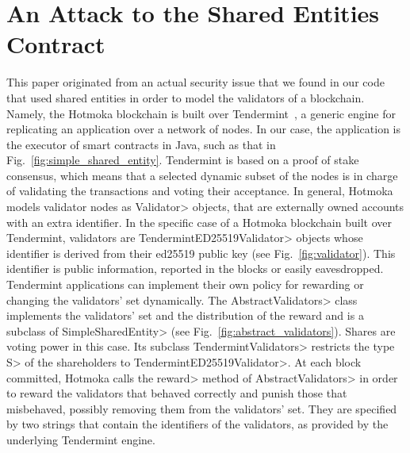 \section{An Attack to the Shared Entities Contract}\label{sec:attack}

This paper originated from an actual security issue that we found in our code
that used shared entities in order to model the validators of a blockchain.
Namely, the Hotmoka blockchain is built over Tendermint~\cite{Kwon14}, a
generic engine for replicating an application over a network of nodes. In our case,
the application is the executor of smart contracts in Java, such as that in
Fig.~\ref{fig:simple_shared_entity}. Tendermint is based on a proof of stake
consensus, which means that a selected dynamic subset of the nodes is in charge of
validating the transactions and voting their acceptance. In general, Hotmoka
models validator nodes as \<Validator> objects, that are externally owned accounts
with an extra identifier. In the specific case of a Hotmoka blockchain built over Tendermint,
validators are \<TendermintED25519Validator> objects whose
identifier is derived from their ed25519 public key (see Fig.~\ref{fig:validator}).
This identifier is public information, reported in the blocks or easily eavesdropped.
Tendermint applications can implement their own
policy for rewarding or changing the validators' set dynamically.
The \<AbstractValidators> class implements the validators' set
and the distribution of the reward and is a subclass of \<SimpleSharedEntity>
(see Fig.~\ref{fig:abstract_validators}).
Shares are voting power in this case.
Its subclass \<TendermintValidators> restricts the type \<S> of the shareholders
to \<TendermintED25519Validator>.
At each block committed, Hotmoka calls the \<reward> method of \<AbstractValidators>
in order to reward the validators that behaved correctly
and punish those that misbehaved, possibly removing them from the validators' set.
They are specified by two strings
that contain the identifiers of the validators, as provided by the underlying
Tendermint engine.

